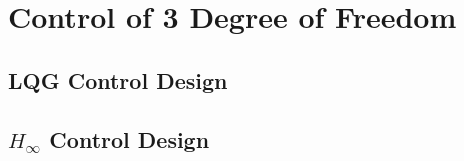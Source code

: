 \chapter{Control of 3 Degree of Freedom}
\section{LQG Control Design}
\section{$H_\infty$ Control Design}
